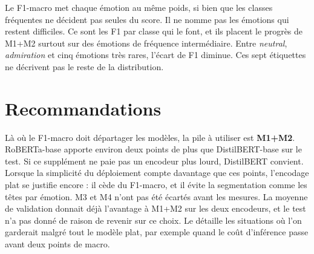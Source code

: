 Le F1-macro met chaque émotion au même poids, si bien que les classes
fréquentes ne décident pas seules du score. Il ne nomme pas les
émotions qui restent difficiles. Ce sont les F1 par classe qui le font,
et ils placent le progrès de M1+M2 surtout sur des émotions de
fréquence intermédiaire. Entre \emph{neutral}, \emph{admiration} et
cinq émotions très rares, l'écart de F1 diminue. Ces sept étiquettes
ne décrivent pas le reste de la distribution.

\section*{Recommandations}
Là où le F1-macro doit départager les modèles, la pile à utiliser est
\textbf{M1+M2}. RoBERTa-base apporte environ deux points de plus que
DistilBERT-base sur le test. Si ce supplément ne paie pas un encodeur
plus lourd, DistilBERT convient. Lorsque la simplicité du déploiement
compte davantage que ces points, l'encodage plat se justifie encore :
il cède du F1-macro, et il évite la segmentation comme les têtes par
émotion. M3 et M4 n'ont pas été écartés avant les mesures. La moyenne
de validation donnait déjà l'avantage à M1+M2 sur les deux encodeurs,
et le test n'a pas donné de raison de revenir sur ce choix. Le
 détaille les situations où l'on garderait
malgré tout le modèle plat, par exemple quand le coût d'inférence passe
avant deux points de macro.

